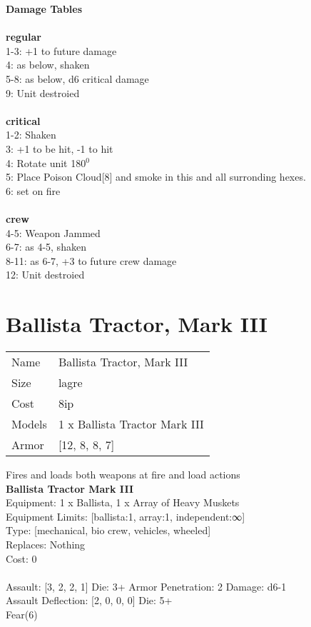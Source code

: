{\bf Damage Tables} \\
\ \\ {\bf regular } \\
1-3: +1 to future damage \\
4: as below, shaken \\
5-8: as below, d6 critical damage \\
9: Unit destroied \\
\ \\ {\bf critical } \\
1-2: Shaken \\
3: +1 to be hit, -1 to hit \\
4: Rotate unit 180$^0$ \\
5: Place Poison Cloud[8] and smoke in this and all surronding hexes. \\
6: set on fire \\
\ \\ {\bf crew } \\
4-5: Weapon Jammed \\
6-7: as 4-5, shaken \\
8-11: as 6-7, +3 to future crew damage \\
12: Unit destroied \\










\pagebreak\pagebreak

\section{ Ballista Tractor, Mark III }

\begin{tabular}{ll}
  Name & Ballista Tractor, Mark III \\
  Size & lagre\\
  Cost & 8ip\\
  Models & 1 x Ballista Tractor Mark III\\
  Armor & [12, 8, 8, 7]\\
\end{tabular}

\noindent Fires and loads both weapons at fire and load actions\\ 


{\bf Ballista Tractor Mark III } \\
Equipment: 1 x Ballista, 1 x Array of Heavy Muskets \\
Equipment Limits: [ballista:1, array:1, independent:∞] \\
Type: [mechanical, bio crew, vehicles, wheeled] \\
Replaces: Nothing \\
Cost: 0\\
\ \\
Assault: [3, 2, 2, 1] Die: 3+ Armor Penetration: 2 Damage: d6-1 \\
Assault Deflection: [2, 0, 0, 0] Die: 5+\\
\indent Fear(6)\\ 
 
